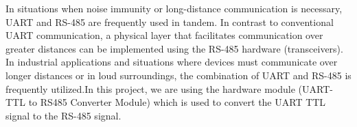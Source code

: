 \documentclass{article}
\begin{document}
	In situations when noise immunity or long-distance communication is necessary, UART and RS-485 are frequently used in tandem. In contrast to conventional UART communication, a physical layer that facilitates communication over greater distances can be implemented using the RS-485 hardware (transceivers). In industrial applications and situations where devices must communicate over longer distances or in loud surroundings, the combination of UART and RS-485 is frequently utilized.In this project, we are using the hardware module (UART-TTL to RS485 Converter Module) which is used to convert the UART TTL signal to the RS-485 signal.
	
\end{document}
